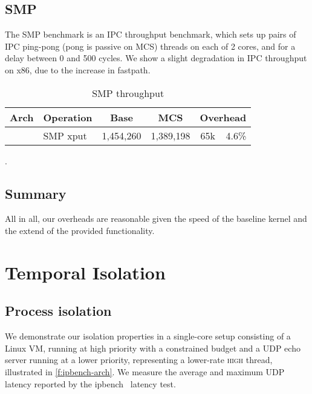 \subsection{SMP}

The SMP benchmark is an IPC throughput benchmark, which sets up pairs of IPC ping-pong
(pong is passive on MCS) threads on each of 2 cores, and for a delay between 0 and 500 cycles.
We show a slight degradation in IPC throughput on x86, due to the increase in fastpath.
\begin{table}[ht]\centering
\begin{tabular}{|c|l| r@{~}l | r@{~}l |r@{~}r|}\hline
\textbf{Arch}           & \multicolumn{1}{c|}{\textbf{Operation}}
                                & \multicolumn{2}{c|}{\textbf{Base}}
                                & \multicolumn{2}{c|}{\textbf{MCS}}
                                & \multicolumn{2}{c|}{\textbf{Overhead}} \\ \hline
%
%
& SMP xput & \multicolumn{2}{l|}{1,454,260} & \multicolumn{2}{l|}{1,389,198} & 65k & 4.6\% \\
\hline
\end{tabular}
\caption{SMP throughput}.
\label{t:micro-smp}
\end{table}

\subsection{Summary}


All in all, our overheads are reasonable given the speed of the baseline kernel and the extend of
the provided functionality.


\section{Temporal Isolation}

\subsection{Process isolation} 
We demonstrate our isolation properties
in a single-core setup consisting of a Linux VM,
running at high priority with a
constrained budget and a UDP echo server running at a lower priority,
representing a lower-rate \textsc{high} thread, illustrated in \autoref{f:ipbench-arch}. We
measure the average  and maximum UDP latency reported by the
ipbench~\citep{Wienand_Macpherson_04} latency test.

